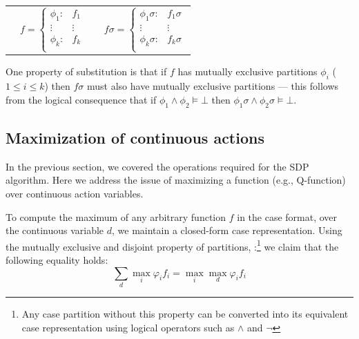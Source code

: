 \documentclass[letterpaper]{article}
\begin{document}
{\footnotesize
\begin{center}
\begin{tabular}{r c c l}
&
\hspace{-6mm} 
  $f = \begin{cases}
    \phi_1: & f_1 \\ 
   \vdots&\vdots\\ 
    \phi_k: & f_k \\ 
  \end{cases}$
&

&
\hspace{-2mm}
  $f\sigma = \begin{cases}
    \phi_1\sigma: & f_1\sigma \\ 
   \vdots&\vdots\\ 
    \phi_k\sigma: & f_k\sigma \\ 
  \end{cases}$
\end{tabular}
\end{center}
}
\normalsize

One property of substitution is that
if $f$ has mutually exclusive partitions $\phi_i$ ($1 \leq i \leq k$)
then $f\sigma$ must also have mutually exclusive partitions ---
this follows from the logical consequence that 
if $\phi_1 \land \phi_2 \models \bot$
then $\phi_1\sigma \land \phi_2\sigma \models \bot$.

\subsection{Maximization of continuous actions}


In the previous section, we covered the operations required for the SDP algorithm. Here we address the issue of maximizing a function (e.g., Q-function) over continuous action variables.

To compute the maximum of any arbitrary function $f$ in the case format, over the continuous variable $d$, we maintain a closed-form case representation. Using the mutually exclusive and disjoint property of partitions, :\footnote{Any case partition without this property can be converted into its equivalent case representation using logical operators such as $\wedge$ and $\neg$} we claim that the following equality holds: 
\begin{equation}
\sum_{d}\max_{i}\varphi_{i}f_{i}=\max_{i}\max_{d}\varphi_{i}f_{i}
\end{equation}
\end{document}
